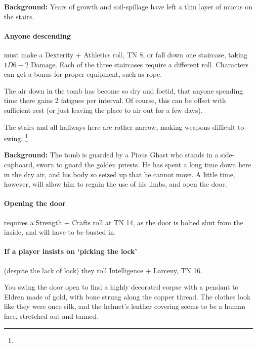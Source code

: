 \textbf{Background:}
Years of growth and soil-spillage have left a thin layer of mucus on the stairs.

\paragraph{Anyone descending}
must make a Dexterity + Athletics roll, TN 8, or fall down one staircase, taking $1D6-2$ Damage.
Each of the three staircases require a different roll.
Characters can get a bonus for proper equipment, such as rope.

The air down in the tomb has become so dry and foetid, that anyone spending time there gains 2 \glspl{fatigue} per \gls{interval}.
Of course, this can be offset with sufficient rest (or just leaving the place to air out for a few days).

The stairs and all hallways here are rather narrow, making weapons difficult to swing.%
\footnote{%
  \iftoggle{core}%
  {\nameref{enclosedcombat}.}%
  {See the Core rules on Enclosed Spaces.}%
}


\textbf{Background:}
The tomb is guarded by a Pious Ghast who stands in a side-cupboard, sworn to guard the golden priests.
He has spent a long time down here in the dry air, and his body so seized up that he cannot move.
A little time, however, will allow him to regain the use of his limbs, and open the door.

\paragraph{Opening the door}
requires a Strength + Crafts roll at TN 14, as the door is bolted shut from the inside, and will have to be busted in.

\paragraph{If a player insists on `picking the lock'}
(despite the lack of lock) they roll Intelligence + Larceny, TN 16.

\begin{boxtext}

  You swing the door open to find a highly decorated corpse with a pendant to Eldren made of gold, with bone strung along the copper thread.
  The clothes look like they were once silk, and the helmet's leather covering seems to be a human face, stretched out and tanned.

\end{boxtext}

